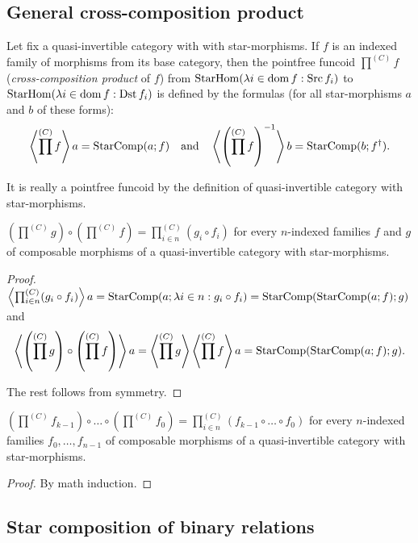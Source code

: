 \subsection{General cross-composition product}
\begin{defn}
Let fix a quasi-invertible category
with with star-morphisms. If $f$ is an indexed family of morphisms
from its base category, then the pointfree funcoid $\prod^{(C)}f$
(\emph{cross-composition product} of $f$) from $\operatorname{StarHom}(\lambda i\in\operatorname{dom} f:\operatorname{Src} f_{i})$
to $\operatorname{StarHom}(\lambda i\in\operatorname{dom} f:\operatorname{Dst} f_{i})$ is defined by the
formulas (for all star-morphisms $a$ and $b$ of these forms): 
\[
\left\langle \prod^{(C)}f\right\rangle a=\operatorname{StarComp}(a;f)\quad\text{and}\quad\left\langle \left(\prod^{(C)}f\right)^{-1}\right\rangle b=\operatorname{StarComp}(b;f^{\dagger}).
\]

\end{defn}
It is really a pointfree funcoid by the definition of quasi-invertible
category with star-morphisms.
\begin{thm}
$\left(\prod^{(C)}g\right)\circ\left(\prod^{(C)}f\right)=\prod_{i\in n}^{(C)}(g_{i}\circ f_{i})$
for every $n$-indexed families $f$ and $g$ of composable morphisms
of a quasi-invertible category with star-morphisms.\end{thm}
\begin{proof}
$\left\langle \prod_{i\in n}^{(C)}(g_{i}\circ f_{i})\right\rangle a=\operatorname{StarComp}(a;\lambda i\in n:g_{i}\circ f_{i})=\operatorname{StarComp}(\operatorname{StarComp}(a;f);g)$
and 
\[
\left\langle \left(\prod^{(C)}g\right)\circ\left(\prod^{(C)}f\right)\right\rangle a=\left\langle \prod^{(C)}g\right\rangle\left\langle \prod^{(C)}f\right\rangle a=\operatorname{StarComp}(\operatorname{StarComp}(a;f);g).
\]


The rest follows from symmetry.\end{proof}
\begin{cor}
\label{prod-n-inf-comps}$\left(\prod^{(C)}f_{k-1}\right)\circ\ldots\circ\left(\prod^{(C)}f_{0}\right)=\prod_{i\in n}^{(C)}(f_{k-1}\circ\ldots\circ f_{0})$
for every $n$-indexed families $f_{0},\ldots,f_{n-1}$ of composable
morphisms of a quasi-invertible category with star-morphisms.\end{cor}
\begin{proof}
By math induction.
\end{proof}

\subsection{Star composition of binary relations}

